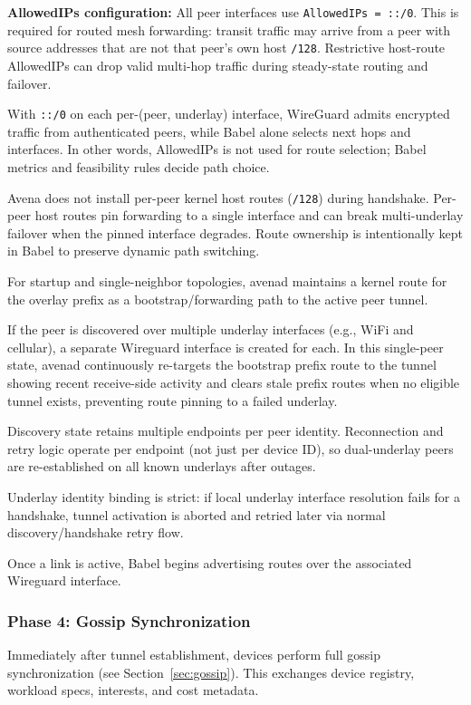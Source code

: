 \textbf{AllowedIPs configuration:} All peer interfaces use \texttt{AllowedIPs = ::/0}. This is required for routed mesh forwarding: transit traffic may arrive from a peer with source addresses that are not that peer's own host \texttt{/128}. Restrictive host-route AllowedIPs can drop valid multi-hop traffic during steady-state routing and failover.

With \texttt{::/0} on each per-(peer, underlay) interface, WireGuard admits encrypted traffic from authenticated peers, while Babel alone selects next hops and interfaces. In other words, AllowedIPs is not used for route selection; Babel metrics and feasibility rules decide path choice.

Avena does not install per-peer kernel host routes (\texttt{/128}) during handshake. Per-peer host routes pin forwarding to a single interface and can break multi-underlay failover when the pinned interface degrades. Route ownership is intentionally kept in Babel to preserve dynamic path switching.

For startup and single-neighbor topologies, avenad maintains a kernel route for the overlay prefix as a bootstrap/forwarding path to the active peer tunnel.

If the peer is discovered over multiple underlay interfaces (e.g., WiFi and cellular), a separate Wireguard interface is created for each. In this single-peer state, avenad continuously re-targets the bootstrap prefix route to the tunnel showing recent receive-side activity and clears stale prefix routes when no eligible tunnel exists, preventing route pinning to a failed underlay.

Discovery state retains multiple endpoints per peer identity. Reconnection and retry logic operate per endpoint (not just per device ID), so dual-underlay peers are re-established on all known underlays after outages.

Underlay identity binding is strict: if local underlay interface resolution fails for a handshake, tunnel activation is aborted and retried later via normal discovery/handshake retry flow.

Once a link is active, Babel begins advertising routes over the associated Wireguard interface.

\subsubsection{Phase 4: Gossip Synchronization}

Immediately after tunnel establishment, devices perform full gossip synchronization (see Section~\ref{sec:gossip}). This exchanges device registry, workload specs, interests, and cost metadata.

